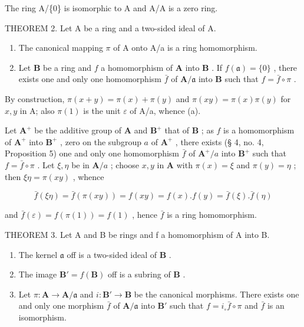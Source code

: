 The ring A/\{0\} is isomorphic to A and A/A is a zero ring.

THEOREM 2. Let A be a ring and a two-sided ideal of A.

\begin{enumerate}
\def\labelenumi{(\alph{enumi})}
\item
  The canonical mapping \(\pi\) of A onto A/a is a ring homomorphism.
\item
  Let \(\mathbf{B}\) be a ring and \(f\) a homomorphism of \(\mathbf{A}\) into \(\mathbf{B}\) . If \(f(\mathfrak{a}) = \{0\}\) , there exists one and only one homomorphism \(\bar{f}\) of \(\mathbf{A} / \mathfrak{a}\) into \(\mathbf{B}\) such that \(f = \bar{f} \circ \pi\) .
\end{enumerate}

By construction, \(\pi(x + y) = \pi(x) + \pi(y)\) and \(\pi(xy) = \pi(x)\pi(y)\) for \(x, y\) in A; also \(\pi(1)\) is the unit \(\varepsilon\) of A/a, whence (a).

Let \(\mathbf{A}^{+}\) be the additive group of \(\mathbf{A}\) and \(\mathbf{B}^{+}\) that of \(\mathbf{B}\) ; as \(f\) is a homomorphism of \(\mathbf{A}^{+}\) into \(\mathbf{B}^{+}\) , zero on the subgroup \(a\) of \(\mathbf{A}^{+}\) , there exists (§ 4, no. 4, Proposition 5) one and only one homomorphism \(\bar{f}\) of \(\mathbf{A}^{+}/a\) into \(\mathbf{B}^{+}\) such that \(f = \bar{f} \circ \pi\) . Let \(\xi, \eta\) be in \(\mathbf{A}/a\) ; choose \(x, y\) in \(\mathbf{A}\) with \(\pi(x) = \xi\) and \(\pi(y) = \eta\) ; then \(\xi \eta = \pi(xy)\) , whence

\[
\bar {f} (\xi \eta) = \bar {f} (\pi (x y)) = f (x y) = f (x). f (y) = \bar {f} (\xi). \bar {f} (\eta)
\]

and \(\bar{f}(\varepsilon) = f(\pi(1)) = f(1)\) , hence \(\bar{f}\) is a ring homomorphism.

THEOREM 3. Let A and B be rings and f a homomorphism of A into B.

\begin{enumerate}
\def\labelenumi{(\alph{enumi})}
\item
  The kernel \(\mathfrak{a}\) off is a two-sided ideal of \(\mathbf{B}\) .
\item
  The image \(\mathbf{B}' = f(\mathbf{B})\) off is a subring of \(\mathbf{B}\) .
\item
  Let \(\pi: \mathbf{A} \to \mathbf{A} / \mathfrak{a}\) and \(i: \mathbf{B}' \to \mathbf{B}\) be the canonical morphisms. There exists one and only one morphism \(\bar{f}\) of \(\mathbf{A} / \mathfrak{a}\) into \(\mathbf{B}'\) such that \(f = i_{\circ} \bar{f} \circ \pi\) and \(\bar{f}\) is an isomorphism.
\end{enumerate}


